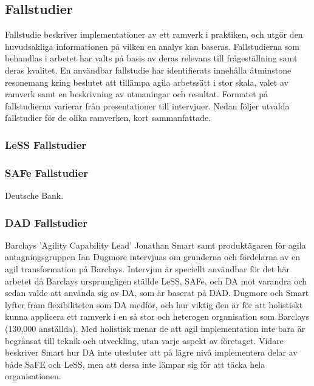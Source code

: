 		
		
		
			

	
	\subsection{Fallstudier}

		Fallstudie beskriver implementationer av ett ramverk i praktiken, och utgör den huvudsakliga informationen på vilken en analys kan baseras.
		Fallstudierna som behandlas i arbetet har valts på basis av deras relevans till frågeställning samt deras kvalitet. En användbar fallstudie har identifierats innehålla åtminstone resonemang kring beslutet att tillämpa agila arbetssätt i stor skala, valet av ramverk samt en beskrivning av utmaningar och resultat. Formatet på fallstudierna varierar från presentationer till intervjuer.
		Nedan följer utvalda fallstudier för de olika ramverken, kort sammanfattade.

		
		
		\subsubsection{LeSS Fallstudier}

			
			

		
		\subsubsection{SAFe Fallstudier}

			Deutsche Bank.
		
		\subsubsection{DAD Fallstudier}
		
			Barclays 'Agility Capability Lead' Jonathan Smart samt produktägaren för agila antagningsgruppen Ian Dugmore intervjuas om grunderna och fördelarna av en agil transformation på Barclays. Intervjun är speciellt användbar för det här arbetet då Barclays ursprungligen ställde LeSS, SAFe, och DA mot varandra och sedan valde att använda sig av DA, som är baserat på DAD. 
			Dugmore och Smart lyfter fram flexibiliteten som DA medför, och hur viktig den är för att holistiskt kunna applicera ett ramverk i en så stor och heterogen organisation som Barclays (130,000 anställda). Med holistisk menar de att agil implementation inte bara är begränsat till teknik och utveckling, utan varje aspekt av företaget. Vidare beskriver Smart hur DA inte utesluter att på lägre nivå implementera delar av både SaFE och LeSS, men att dessa inte lämpar sig för att täcka hela organisationen.
			
